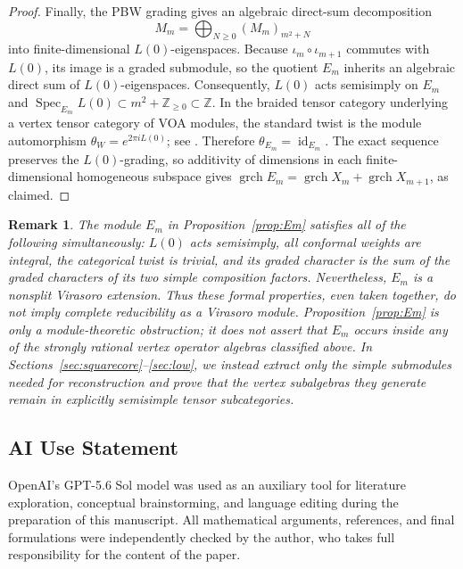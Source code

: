 \documentclass[12pt,leqno]{amsart}
\numberwithin{equation}{section} \newtheorem{thm}{Theorem}[section] \newtheorem{lem}[thm]{Lemma} \newtheorem{ex}[thm]{Example} \newtheorem{prop}[thm]{Proposition} \newtheorem{cor}[thm]{Corollary} \newtheorem{defi}[thm]{Definition} \newtheorem{rmk}[thm]{Remark} \newtheorem{notation}[thm]{Notation}
\newcommand{\id}{\operatorname{id}}
\newcommand{\grch}{\operatorname{grch}}
\def\Z{\mathbb{Z}} \def\N{\mathbb{N}} \def\A{\mathbb{A}} \def\C{\mathbb{C}} \def\R{\mathbb{R}} \def\Q{\mathbb{Q}} \def\F{\mathbb{F}}
\begin{document}
\begin{proof}
Finally, the PBW grading gives an algebraic direct-sum decomposition
\[
M_m=\bigoplus_{N\ge0}(M_m)_{m^2+N}
\]
into finite-dimensional $L(0)$-eigenspaces. Because $\iota_m\circ\iota_{m+1}$ commutes with $L(0)$, its image is a graded submodule, so the quotient $E_m$ inherits an algebraic direct sum of $L(0)$-eigenspaces. Consequently, $L(0)$ acts semisimply on $E_m$ and \(\operatorname{Spec}_{E_m}L(0)\subset m^2+\Z_{\ge0}\subset\Z\). In the braided tensor category underlying a vertex tensor category of VOA modules, the standard twist is the module automorphism \(\theta_W=e^{2\pi iL(0)}\); see \cite[Section~3.3]{CKM}. Therefore \(\theta_{E_m}=\id_{E_m}\). The exact sequence preserves the $L(0)$-grading, so additivity of dimensions in each finite-dimensional homogeneous subspace gives \(\grch E_m=\grch X_m+\grch X_{m+1}\), as claimed.
\end{proof}

\begin{rmk}
The module $E_m$ in Proposition~\ref{prop:Em} satisfies all of the following simultaneously: $L(0)$ acts semisimply, all conformal weights are integral, the categorical twist is trivial, and its graded character is the sum of the graded characters of its two simple composition factors. Nevertheless, $E_m$ is a nonsplit Virasoro extension. Thus these formal properties, even taken together, do not imply complete reducibility as a Virasoro module. Proposition~\ref{prop:Em} is only a module-theoretic obstruction; it does not assert that $E_m$ occurs inside any of the strongly rational vertex operator algebras classified above. In Sections~\ref{sec:squarecore}--\ref{sec:low}, we instead extract only the simple submodules needed for reconstruction and prove that the vertex subalgebras they generate remain in explicitly semisimple tensor subcategories.
\end{rmk}

\subsection*{AI Use Statement}

OpenAI's GPT-5.6 Sol model was used as an auxiliary tool for literature exploration, conceptual brainstorming, and language editing during the preparation of this manuscript. All mathematical arguments, references, and final formulations were independently checked by the author, who takes full responsibility for the content of the paper.
\end{document}
